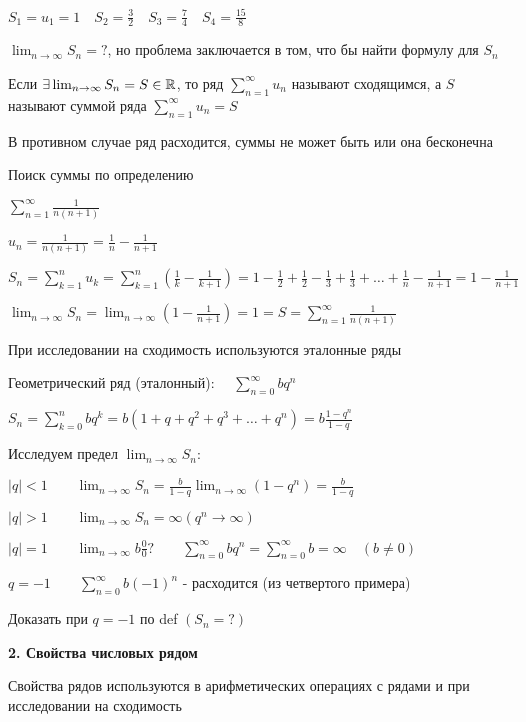 \documentclass[12pt]{article}
\begin{document}
    $S_1 = u_1 = 1 \quad S_2 = \frac{3}{2} \quad S_3 = \frac{7}{4} \quad S_4 = \frac{15}{8}$

    $\lim_{n \to \infty} S_n = ?$, но проблема заключается в том, что бы найти формулу для $S_n$

    \Def Если $\exists \lim_{n \to\infty} S_n = S \in \mathbb{R}$, то ряд $\sum_{n = 1}^\infty u_n$ называют сходящимся,
    а $S$ называют суммой ряда $\sum_{n = 1}^\infty u_n = S$

    \Notas В противном случае ряд расходится, суммы не может быть или она бесконечна

    \Ex Поиск суммы по определению

    $\sum_{n = 1}^\infty \frac{1}{n (n + 1)}$

    $u_n = \frac{1}{n(n + 1)} = \frac{1}{n} - \frac{1}{n + 1}$

    $S_n = \sum_{k = 1}^n u_k = \sum_{k = 1}^n \left(\frac{1}{k} - \frac{1}{k + 1}\right) = 1 - \frac{1}{2} + \frac{1}{2} - \frac{1}{3} + \frac{1}{3} + \dots + \frac{1}{n} - \frac{1}{n + 1} = 1 - \frac{1}{n + 1}$

    $\lim_{n \to \infty} S_n = \lim_{n \to \infty} \left(1 - \frac{1}{n + 1}\right) = 1 = S = \sum_{n = 1}^\infty \frac{1}{n(n + 1)}$

    \Nota При исследовании на сходимость используются эталонные ряды

    \Ex Геометрический ряд (эталонный): \ \ $\sum_{n = 0}^\infty b q^n$

    $S_n = \sum_{k = 0}^n b q^k = b (1 + q + q^2 + q^3 + \dots + q^n) = b \frac{1 - q^n}{1 - q}$

    Исследуем предел $\lim_{n\to\infty} S_n$:

    $|q| < 1 \quad\quad \lim_{n\to\infty} S_n = \frac{b}{1 - q} \lim_{n \to\infty} (1 - q^n) = \frac{b}{1 - q}$

    $|q| > 1 \quad\quad \lim_{n\to\infty} S_n = \infty (q^n \to\infty)$

    $|q| = 1 \quad\quad \lim_{n\to\infty} b \frac{0}{0} ? \quad\quad \sum_{n = 0}^\infty b q^n = \sum_{n = 0}^\infty b = \infty \quad (b \neq 0)$

    $q = -1 \quad\quad \sum_{n = 0}^\infty b (-1)^n$ - расходится (из четвертого примера)

    \Lab Доказать при $q = -1$ по def $(S_n = ?)$

    \mediumvspace

    \textbf{2. Свойства числовых рядом}

    \Notas Свойства рядов используются в арифметических операциях с рядами и при исследовании на сходимость
\end{document}

